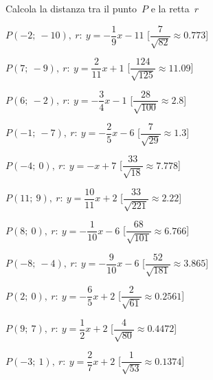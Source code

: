 \begin{esercizio}\label{ese:}
 Calcola la distanza tra il punto~$P$ e la retta~$r$
 \begin{enumeratea}
  \item  $P(-2;~-10),~r:~y = -\dfrac{1}{9} x -11$ \hfill 
   [$\dfrac{7}{\sqrt{82}}\approx 0.773$]
  \item  $P(7;~-9),~r:~y = \dfrac{2}{11} x +1$ \hfill 
   [$\dfrac{124}{\sqrt{125}}\approx 11.09$]
  \item  $P(6;~-2),~r:~y = -\dfrac{3}{4} x -1$ \hfill 
   [$\dfrac{28}{\sqrt{100}}\approx   2.8$]
  \item  $P(-1;~-7),~r:~y = -\dfrac{2}{5} x -6$ \hfill 
   [$\dfrac{7}{\sqrt{29}}\approx   1.3$]
  \item  $P(-4;~0),~r:~y = - x +7$ \hfill 
   [$\dfrac{33}{\sqrt{18}}\approx 7.778$]
  \item  $P(11;~9),~r:~y = \dfrac{10}{11} x +2$ \hfill 
   [$\dfrac{33}{\sqrt{221}}\approx  2.22$]
  \item  $P(8;~0),~r:~y = -\dfrac{1}{10} x -6$ \hfill 
   [$\dfrac{68}{\sqrt{101}}\approx 6.766$]
  \item  $P(-8;~-4),~r:~y = -\dfrac{9}{10} x -6$ \hfill 
   [$\dfrac{52}{\sqrt{181}}\approx 3.865$]
  \item  $P(2;~0),~r:~y = -\dfrac{6}{5} x +2$ \hfill 
   [$\dfrac{2}{\sqrt{61}}\approx0.2561$]
  \item  $P(9;~7),~r:~y = \dfrac{1}{2} x +2$ \hfill 
   [$\dfrac{4}{\sqrt{80}}\approx0.4472$]
  \item  $P(-3;~1),~r:~y = \dfrac{2}{7} x +2$ \hfill 
   [$\dfrac{1}{\sqrt{53}}\approx0.1374$]
 \end{enumeratea}
\end{esercizio}

